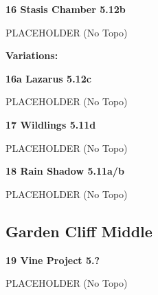 \begin{multicols}{2}
\needspace{1.5cm}
\label{rt:Stasis Chamber}
\colorbox{Goldenrod!50}{
\parbox{0.95\linewidth}{
\textbf{
16 Stasis Chamber 5.12b  
}}}

\begin{adjustwidth}{0.5cm}{}			
PLACEHOLDER (No Topo)
\end{adjustwidth}

\begin{adjustwidth}{0.5cm}{}				
\needspace{3cm}
\textbf{Variations:} \newline

\needspace{1.5cm}
\label{vr:Lazarus}
\colorbox{Goldenrod!50}{
\parbox{0.95\linewidth}{
\textbf{
16a Lazarus 5.12c  
}}}

\begin{adjustwidth}{0.5cm}{}			
PLACEHOLDER (No Topo)
\end{adjustwidth}


\end{adjustwidth}


\needspace{1.5cm}
\label{rt:Wildlings}
\colorbox{RoyalBlue!20}{
\parbox{0.95\linewidth}{
\textbf{
17 Wildlings 5.11d  
}}}

\begin{adjustwidth}{0.5cm}{}			
PLACEHOLDER (No Topo)
\end{adjustwidth}



\needspace{1.5cm}
\label{rt:Rain Shadow}
\colorbox{RoyalBlue!20}{
\parbox{0.95\linewidth}{
\textbf{
18 Rain Shadow 5.11a/b  
}}}

\begin{adjustwidth}{0.5cm}{}			
PLACEHOLDER (No Topo)
\end{adjustwidth}




\needspace{1.5cm}
\subsection*{Garden Cliff Middle}\label{bf:Garden Cliff Middle}
	


\needspace{1.5cm}
\label{rt:Vine Project}
\colorbox{black!20}{
\parbox{0.95\linewidth}{
\textbf{
19 Vine Project 5.?  
}}}

\begin{adjustwidth}{0.5cm}{}			
PLACEHOLDER (No Topo)
\end{adjustwidth}




\end{multicols}
